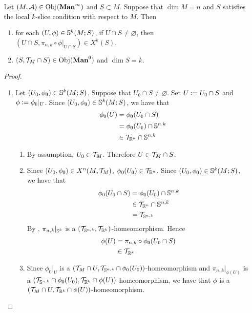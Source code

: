 \documentclass{book}
\begin{document}
	\begin{ex}
		Let $(M, \MA) \in \Obj(\Maninf)$ and $S \subset M$. Suppose that $\dim M = n$ and $S$ satisfies the local $k$-slice condition with respect to $M$. Then 
		\begin{enumerate}
			\item for each $(U, \phi) \in \S^k(M; S)$, if $U \cap S \neq \varnothing$, then $(U \cap S, \pi_{n, k} \circ \phi|_{U \cap S}) \in X^k(S)$, 
			\item $(S, \MT_M \cap S) \in \Obj(\Man0)$ and $\dim S = k$.
		\end{enumerate}
	\end{ex}

	\begin{proof}\
		\begin{enumerate}
			\item 
			Let $(U_0, \phi_0) \in \S^k(M; S)$. Suppose that $U_0 \cap S \neq \varnothing$. Set $U \defeq U_0 \cap S$ and $\phi \defeq \phi_0|_U$. Since $(U_0, \phi_0) \in \S^k(M; S)$, we have that 
			\begin{align*}
				\phi_0(U)
				& = \phi_0(U_0 \cap S) \\
				& = \phi_0(U_0) \cap \S^{n,k} \\
				& \in \MT_{\R^n} \cap \S^{n,k}
			\end{align*}
			\begin{enumerate}
				\item By assumption, $U_0 \in \MT_M$. Therefore $U \in \MT_M \cap S$.
				\item Since $(U_0, \phi_0) \in X^n(M, \MT_M)$, $\phi_0(U_0) \in \MT_{\R^n}$. Since $(U_0, \phi_0) \in \S^k(M; S)$, we have that 
				\begin{align*}
					\phi_0(U_0 \cap S) 
					& = \phi_0(U_0) \cap \S^{n,k} \\
					& \in \MT_{\R^n} \cap \S^{n,k} \\
					& = \MT_{\S^{n,k}}
				\end{align*}
				By , $\pi_{n,k}|_{\S^k}$ is a $(\MT_{\S^{n,k}}, \MT_{\R^k})$-homeomorphism. Hence 
				\begin{align*}
					\phi(U)
					& = \pi_{n,k} \circ \phi_0 (U_0 \cap S) \\
					& \in \MT_{\R^k}
				\end{align*}
				\item Since $\phi_0|_U$ is a $(\MT_M \cap U, \MT_{\S^{n,k}} \cap \phi_0(U_0))$-homeomorphism and $\pi_{n,k}|_{\phi(U)}$ is a $(\MT_{\S^{n,k}} \cap \phi_0(U_0), \MT_{\R^k} \cap \phi(U))$-homeomorphism, we have that $\phi$ is a $(\MT_M \cap U, \MT_{\R^k} \cap \phi(U))$-homeomorphism. 

\end{enumerate}
\end{enumerate}
\end{proof}
\end{document}
